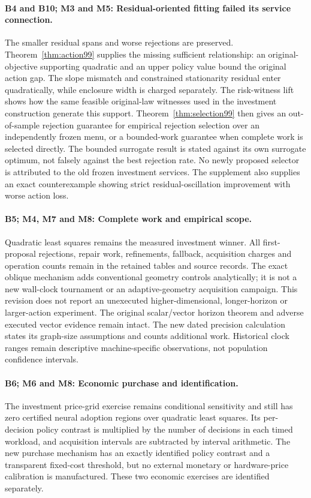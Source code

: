 \documentclass[ecta,nameyear,draft]{econsocart}
\begin{document}
\paragraph{B4 and B10; M3 and M5: Residual-oriented fitting failed its service connection.}
The smaller residual spans and worse rejections are preserved. Theorem~\ref{thm:action99} supplies the missing sufficient relationship: an original-objective supporting quadratic and an upper policy value bound the original action gap. The slope mismatch and constrained stationarity residual enter quadratically, while enclosure width is charged separately. The risk-witness lift shows how the same feasible original-law witnesses used in the investment construction generate this support. Theorem~\ref{thm:selection99} then gives an out-of-sample rejection guarantee for empirical rejection selection over an independently frozen menu, or a bounded-work guarantee when complete work is selected directly. The bounded surrogate result is stated against its own surrogate optimum, not falsely against the best rejection rate. No newly proposed selector is attributed to the old frozen investment services. The supplement also supplies an exact counterexample showing strict residual-oscillation improvement with worse action loss.

\paragraph{B5; M4, M7 and M8: Complete work and empirical scope.}
Quadratic least squares remains the measured investment winner. All first-proposal rejections, repair work, refinements, fallback, acquisition charges and operation counts remain in the retained tables and source records. The exact oblique mechanism adds conventional geometry controls analytically; it is not a new wall-clock tournament or an adaptive-geometry acquisition campaign. This revision does not report an unexecuted higher-dimensional, longer-horizon or larger-action experiment. The original scalar/vector horizon theorem and adverse executed vector evidence remain intact. The new dated precision calculation states its graph-size assumptions and counts additional work. Historical clock ranges remain descriptive machine-specific observations, not population confidence intervals.

\paragraph{B6; M6 and M8: Economic purchase and identification.}
The investment price-grid exercise remains conditional sensitivity and still has zero certified neural adoption regions over quadratic least squares. Its per-decision policy contrast is multiplied by the number of decisions in each timed workload, and acquisition intervals are subtracted by interval arithmetic. The new purchase mechanism has an exactly identified policy contrast and a transparent fixed-cost threshold, but no external monetary or hardware-price calibration is manufactured. These two economic exercises are identified separately.
\end{document}
